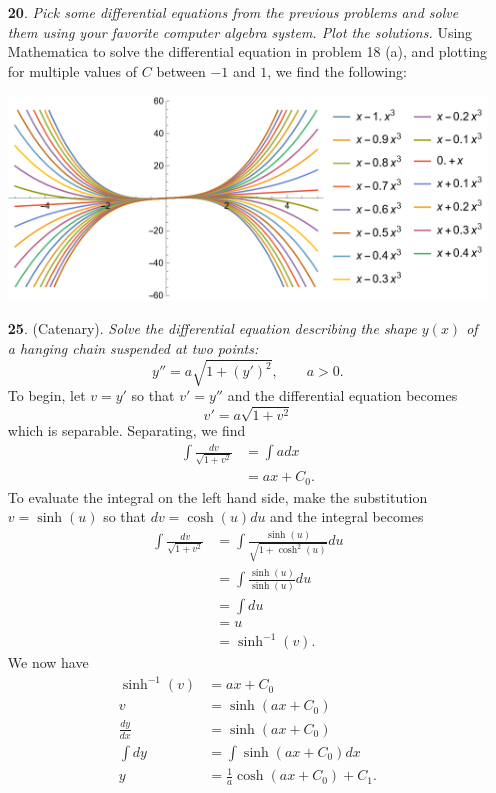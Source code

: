 \documentclass{article}
\begin{document}
\begin{itemize}
    \item[\textbf{20}.] \textit{Pick some differential equations from the previous problems and solve them using your favorite computer algebra system. Plot the solutions.}
    \newline\newline
    Using Mathematica to solve the differential equation in problem 18 (a), and plotting for multiple values of $C$ between $-1$ and $1$, we find the following:
    \begin{center}
        \includegraphics[scale = 0.7]{cas_dePlots.png}
    \end{center}
    

    \item[\textbf{25}.] (Catenary). \textit{Solve the differential equation describing the shape $y(x)$ of a hanging chain suspended at two points:}
    \[y'' = a\sqrt{1 + (y')^2}, \hspace{2em} a > 0.\]
    To begin, let $v = y'$ so that $v' = y''$ and the differential equation becomes
    \[v' = a\sqrt{1 + v^2}\]
    which is separable. Separating, we find
    \begin{align*}
        \int\frac{dv}{\sqrt{1 + v^2}} &= \int a dx\\
        &= ax + C_0.
    \end{align*}
    To evaluate the integral on the left hand side, make the substitution $v = \sinh(u)$ so that $dv = \cosh(u)du$ and the integral becomes
    \begin{align*}
        \int\frac{dv}{\sqrt{1 + v^2}}&= \int\frac{\sinh(u)}{\sqrt{1 + \cosh^2(u)}}du\\
        &= \int\frac{\sinh(u)}{\sinh(u)}du\\
        &= \int du\\
        &= u\\
        &= \sinh^{-1}(v).
    \end{align*}
    We now have
    \begin{align*}
        \sinh^{-1}(v) &= ax + C_0\\
        v &= \sinh(ax + C_0)\\
        \frac{dy}{dx} &= \sinh(ax + C_0)\\
        \int dy &= \int \sinh(ax + C_0)dx\\
        y &= \frac{1}{a}\cosh(ax + C_0) + C_1.
    \end{align*}
    
    
    
    
\end{itemize}
\end{document}
